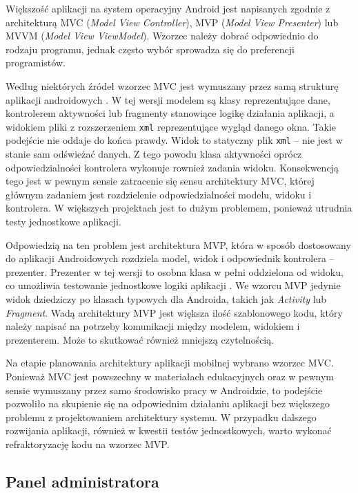 \documentclass[a4paper,twoside,12pt]{book}
\newcommand{\obcy}[1]{\emph{#1}}
\newcommand{\english}[1]{{\selectlanguage{british}\obcy{#1}}}
\begin{document}
Większość aplikacji na system operacyjny Android jest napisanych zgodnie z architekturą MVC (\english{Model View Controller}), MVP (\english{Model View Presenter}) lub MVVM (\english{Model View ViewModel}). Wzorzec należy dobrać odpowiednio do rodzaju programu, jednak często wybór sprowadza się do preferencji programistów. 

Według niektórych źródeł wzorzec MVC jest wymuszany przez samą strukturę aplikacji androidowych \cite{bib:internetMVC}. W tej wersji modelem są klasy reprezentujące dane, kontrolerem aktywności lub fragmenty stanowiące logikę działania aplikacji, a widokiem pliki z rozszerzeniem \texttt{xml} reprezentujące wygląd danego okna. Takie podejście nie oddaje do końca prawdy. Widok to statyczny plik \texttt{xml} -- nie jest w stanie sam odświeżać danych. Z tego powodu klasa aktywności oprócz odpowiedzialności kontrolera wykonuje rownież zadania widoku. Konsekwencją tego jest w pewnym sensie zatracenie się sensu architektury MVC, której głównym zadaniem jest rozdzielenie odpowiedzialności modelu, widoku i kontrolera. W większych projektach jest to dużym problemem, ponieważ utrudnia testy jednostkowe aplikacji.

Odpowiedzią na ten problem jest architektura MVP, która w sposób dostosowany do aplikacji Androidowych rozdziela model, widok i odpowiednik kontrolera -- prezenter. Prezenter w tej wersji to osobna klasa w pełni oddzielona od widoku, co umożliwia testowanie jednostkowe logiki aplikacji \cite{bib:lou2016comparison}. We wzorcu MVP jedynie widok dziedziczy po klasach typowych dla Androida, takich jak \english{Activity} lub \english{Fragment}. Wadą architektury MVP jest większa ilość szablonowego kodu, który należy napisać na potrzeby komunikacji między modelem, widokiem i prezenterem. Może to skutkować również mniejszą czytelnością.

Na etapie planowania architektury aplikacji mobilnej wybrano wzorzec MVC. Ponieważ MVC jest powszechny w materiałach edukacyjnych oraz w pewnym sensie wymuszany przez samo środowisko pracy w Androidzie, to podejście pozwoliło na skupienie się na odpowiednim działaniu aplikacji bez większego problemu z projektowaniem architektury systemu. W przypadku dalszego rozwijania aplikacji, również w kwestii testów jednostkowych, warto wykonać refraktoryzację kodu na wzorzec MVP. 

\subsection{Panel administratora}
\label{sec:2}
\end{document}
